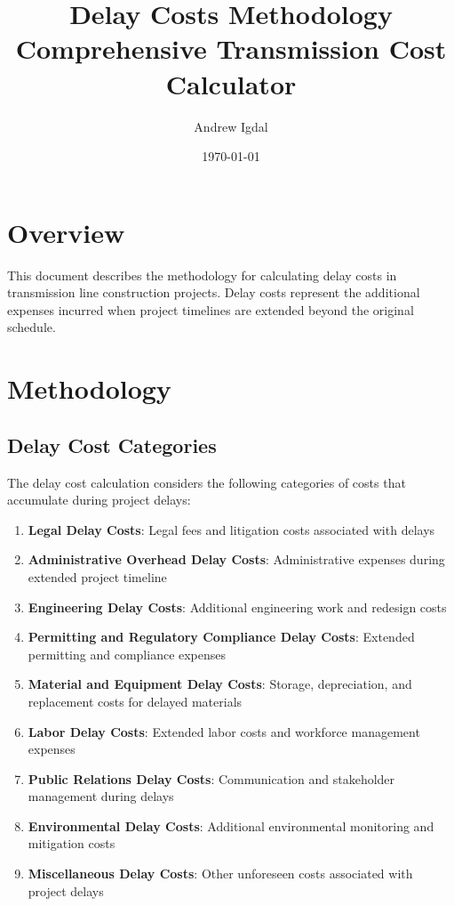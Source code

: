 \documentclass[12pt]{article}
\title{Delay Costs Methodology\\Comprehensive Transmission Cost Calculator}
\author{Andrew Igdal}
\date{\today}
\begin{document}
\maketitle

\section{Overview}
This document describes the methodology for calculating delay costs in transmission line construction projects. Delay costs represent the additional expenses incurred when project timelines are extended beyond the original schedule.

\section{Methodology}

\subsection{Delay Cost Categories}
The delay cost calculation considers the following categories of costs that accumulate during project delays:

\begin{enumerate}
    \item \textbf{Legal Delay Costs}: Legal fees and litigation costs associated with delays
    \item \textbf{Administrative Overhead Delay Costs}: Administrative expenses during extended project timeline
    \item \textbf{Engineering Delay Costs}: Additional engineering work and redesign costs
    \item \textbf{Permitting and Regulatory Compliance Delay Costs}: Extended permitting and compliance expenses
    \item \textbf{Material and Equipment Delay Costs}: Storage, depreciation, and replacement costs for delayed materials
    \item \textbf{Labor Delay Costs}: Extended labor costs and workforce management expenses
    \item \textbf{Public Relations Delay Costs}: Communication and stakeholder management during delays
    \item \textbf{Environmental Delay Costs}: Additional environmental monitoring and mitigation costs
    \item \textbf{Miscellaneous Delay Costs}: Other unforeseen costs associated with project delays
\end{enumerate}
\end{document}
